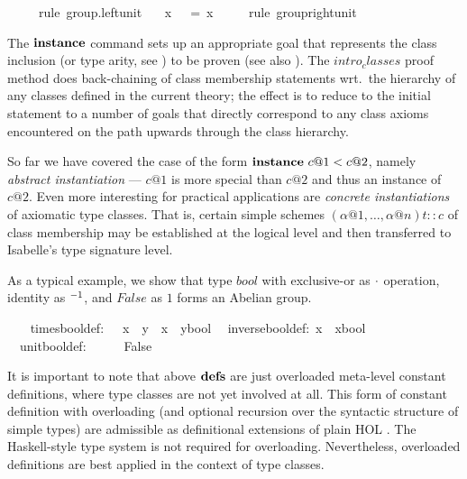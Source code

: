 \begin{isabelle}
\ \ \ \ \ {\isacharparenleft}rule\ group.left{\isacharunderscore}unit{\isacharparenright}\isanewline
\ \ \ {\isachardoublequote}x\ {\isasymOtimes}\ {\isasymunit}\ =\ x{\isachardoublequote}\isanewline
\ \ \ \ \ {\isacharparenleft}rule\ group{\isacharunderscore}right{\isacharunderscore}unit{\isacharparenright}\isanewline
{}%
\begin{isamarkuptext}%
\medskip The $\emph{\bf instance}$ command sets up an appropriate
 goal that represents the class inclusion (or type arity, see
 ) to be proven
 (see also \cite{isabelle-isar-ref}).  The $intro_classes$ proof
 method does back-chaining of class membership statements wrt.\ the
 hierarchy of any classes defined in the current theory; the effect is
 to reduce to the initial statement to a number of goals that directly
 correspond to any class axioms encountered on the path upwards
 through the class hierarchy.%
\end{isamarkuptext}%
%
%
\begin{isamarkuptext}%
So far we have covered the case of the form
 $\emph{\bf instance}~c@1 < c@2$, namely \emph{abstract
 instantiation} --- $c@1$ is more special than $c@2$ and thus an
 instance of $c@2$.  Even more interesting for practical applications
 are \emph{concrete instantiations} of axiomatic type classes.  That
 is, certain simple schemes $(\alpha@1, \ldots, \alpha@n)t :: c$ of
 class membership may be established at the logical level and then
 transferred to Isabelle's type signature level.

 \medskip As a typical example, we show that type $bool$ with
 exclusive-or as $\cdot$ operation, identity as $\emph{${}^{-1}$}$, and
 $False$ as $1$ forms an Abelian group.%
\end{isamarkuptext}%
\ {\isacharparenleft}\isanewline
\ \ times{\isacharunderscore}bool{\isacharunderscore}def:\ \ \ {\isachardoublequote}x\ {\isasymOtimes}\ y\ {\isasymequiv}\ x\ {\isasymnoteq}\ {\isacharparenleft}y{\isasymColon}bool{\isacharparenright}{\isachardoublequote}\isanewline
\ \ inverse{\isacharunderscore}bool{\isacharunderscore}def:\ {\isachardoublequote}x{\isasyminv}\ {\isasymequiv}\ x{\isasymColon}bool{\isachardoublequote}\isanewline
\ \ unit{\isacharunderscore}bool{\isacharunderscore}def:\ \ \ \ {\isachardoublequote}{\isasymunit}\ {\isasymequiv}\ False{\isachardoublequote}%
\begin{isamarkuptext}%
\medskip It is important to note that above ${\mathord{\mathbf{defs}}}$ are just
 overloaded meta-level constant definitions, where type classes are
 not yet involved at all.  This form of constant definition with
 overloading (and optional recursion over the syntactic structure of
 simple types) are admissible as definitional extensions of plain HOL
 \cite{Wenzel:1997:TPHOL}.  The Haskell-style type system is not
 required for overloading.  Nevertheless, overloaded definitions are
 best applied in the context of type classes.


\end{isamarkuptext}
\end{isabelle}
